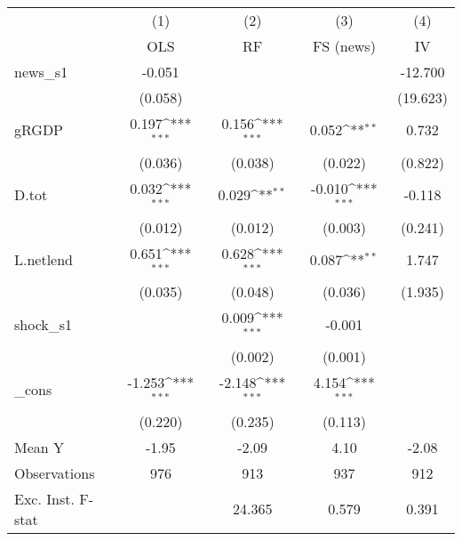 {
\def\sym#1{\ifmmode^{#1}\else\(^{#1}\)\fi}
\begin{tabular}{l*{4}{c}}
\toprule
            &\multicolumn{1}{c}{(1)}&\multicolumn{1}{c}{(2)}&\multicolumn{1}{c}{(3)}&\multicolumn{1}{c}{(4)}\\
            &\multicolumn{1}{c}{OLS}&\multicolumn{1}{c}{RF}&\multicolumn{1}{c}{FS (news)}&\multicolumn{1}{c}{IV}\\
\midrule
news\_s1     &      -0.051         &                     &                     &     -12.700         \\
            &     (0.058)         &                     &                     &    (19.623)         \\
\addlinespace
gRGDP       &       0.197\sym{***}&       0.156\sym{***}&       0.052\sym{**} &       0.732         \\
            &     (0.036)         &     (0.038)         &     (0.022)         &     (0.822)         \\
\addlinespace
D.tot       &       0.032\sym{***}&       0.029\sym{**} &      -0.010\sym{***}&      -0.118         \\
            &     (0.012)         &     (0.012)         &     (0.003)         &     (0.241)         \\
\addlinespace
L.netlend   &       0.651\sym{***}&       0.628\sym{***}&       0.087\sym{**} &       1.747         \\
            &     (0.035)         &     (0.048)         &     (0.036)         &     (1.935)         \\
\addlinespace
shock\_s1    &                     &       0.009\sym{***}&      -0.001         &                     \\
            &                     &     (0.002)         &     (0.001)         &                     \\
\addlinespace
\_cons      &      -1.253\sym{***}&      -2.148\sym{***}&       4.154\sym{***}&                     \\
            &     (0.220)         &     (0.235)         &     (0.113)         &                     \\
\midrule
Mean Y      &       -1.95         &       -2.09         &        4.10         &       -2.08         \\
Observations&         976         &         913         &         937         &         912         \\
Exc. Inst. F-stat&                     &      24.365         &       0.579         &       0.391         \\
\bottomrule
\end{tabular}
}
